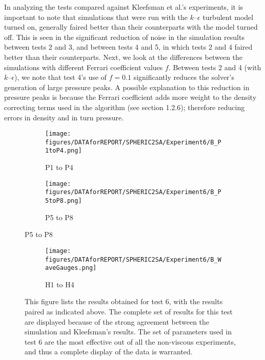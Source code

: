 \documentclass{../GPUSPHtemplate}
\begin{document}
In analyzing the tests compared against Kleefsman et al.'s experiments, it is important to note that simulations that were run with the $k$--$\epsilon$ turbulent model turned on, generally faired better than their counterparts with the model turned off. This is seen in the significant reduction of noise in the simulation results between tests 2 and 3, and between tests 4 and 5, in which tests 2 and 4 faired better than their counterparts. Next, we look at the differences between the simulations with different Ferrari coefficient values $f$. Between tests 2 and 4 (with $k$--$\epsilon$), we note that test 4's use of $f = 0.1$ significantly reduces the solver's generation of large pressure peaks. A possible explanation to this reduction in pressure peaks is because the Ferrari coefficient adds more weight to the density correcting terms used in the algorithm (see section 1.2.6); therefore reducing errors in density and in turn pressure.

\begin{figure}[H]
	\centering
  \begin{subfigure}[b]{1\linewidth}
      \texttt{[image: figures/DATAforREPORT/SPHERIC2SA/Experiment6/B\_P1toP4.png]}
      \caption{P1 to P4}
  \end{subfigure}%
  
  \begin{subfigure}[b]{1\linewidth}
   		\texttt{[image: figures/DATAforREPORT/SPHERIC2SA/Experiment6/B\_P5toP8.png]} 
		\caption{P5 to P8}  
  \end{subfigure} 
  
\end{figure}

\begin{figure}[H]\ContinuedFloat    

  \begin{subfigure}[b]{1\linewidth}
   		\texttt{[image: figures/DATAforREPORT/SPHERIC2SA/Experiment6/B\_WaveGauges.png]} 
 		\caption{H1 to H4} 
  \end{subfigure} 
  
  \caption{This figure lists the results obtained for test 6, with the results paired as indicated above. The complete set of results for this test are displayed because of the strong agreement between the simulation and Kleefsman's results. The set of parameters used in test 6 are the most effective out of all the non-viscous experiments, and thus a complete display of the data is warranted.}

\end{figure}
\end{document}
